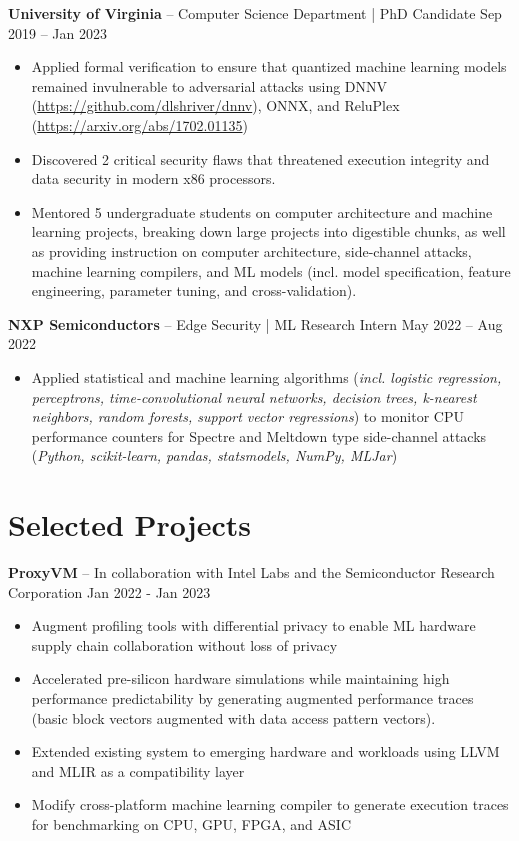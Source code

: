 \documentclass[10pt,letterpaper]{article}
\begin{document}
\vspace{3pt}
\textbf{University of Virginia} -- Computer Science Department | PhD Candidate \hfill Sep 2019 -- Jan 2023
\begin{itemize}
    \item Applied formal verification to ensure that quantized machine learning models remained invulnerable to adversarial attacks using DNNV (\href{https://github.com/dlshriver/dnnv}{https://github.com/dlshriver/dnnv}), ONNX, and ReluPlex (\href{https://arxiv.org/abs/1702.01135}{https://arxiv.org/abs/1702.01135})
    \item Discovered 2 critical security flaws that threatened execution integrity and data security in modern x86 processors.
    \item Mentored 5 undergraduate students on computer architecture and machine learning projects, breaking down large projects into digestible chunks, as well as providing instruction on computer architecture, side-channel attacks, machine learning compilers, and ML models (incl. model specification, feature engineering, parameter tuning, and cross-validation).
\end{itemize}

\vspace{3pt}
\textbf{NXP Semiconductors} -- Edge Security | ML Research Intern \hfill May 2022 -- Aug 2022
\begin{itemize}
    \item Applied statistical and machine learning algorithms (\textit{incl. logistic regression, perceptrons, time-convolutional neural networks, decision trees, k-nearest neighbors, random forests, support vector regressions}) to monitor CPU performance counters for Spectre and Meltdown type side-channel attacks (\textit{Python, scikit-learn, pandas, statsmodels, NumPy, MLJar})
\end{itemize}

\section{Selected Projects}

\vspace{3pt}
\textbf{ProxyVM} -- In collaboration with Intel Labs and the Semiconductor Research Corporation \hfill Jan 2022 - Jan 2023
\begin{itemize}
    \item Augment profiling tools with differential privacy to enable ML hardware supply chain collaboration without loss of privacy
    \item Accelerated pre-silicon hardware simulations while maintaining high performance predictability by generating augmented performance traces (basic block vectors augmented with data access pattern vectors).
    \item Extended existing system to emerging hardware and workloads using LLVM and MLIR as a compatibility layer
    \item Modify cross-platform machine learning compiler to generate execution traces for benchmarking on CPU, GPU, FPGA, and ASIC
\end{itemize}
\end{document}
